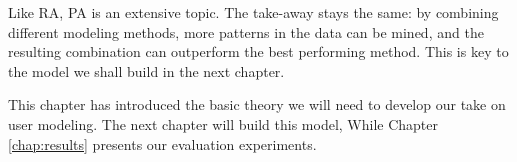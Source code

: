 Like RA, PA is an extensive topic.
The take-away stays the same: by combining different modeling methods,
more patterns in the data can be mined, and 
the resulting combination can outperform the best performing method.
This is key to the model we shall build in the next chapter.

\hr

This chapter has introduced the basic theory we will need to develop our take on user modeling.
The next chapter will build this model,
While Chapter \ref{chap:results} presents our evaluation experiments.


